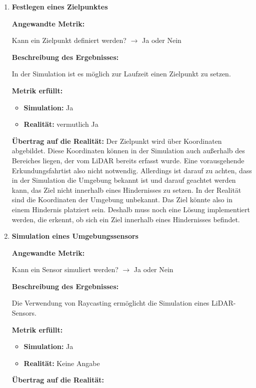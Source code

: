 \begin{enumerate}[leftmargin=*]
    \item \textbf{Festlegen eines Zielpunktes}

    \textbf{Angewandte Metrik:}

    Kann ein Zielpunkt definiert werden? $\to$ Ja oder Nein

    \textbf{Beschreibung des Ergebnisses:}

    In der Simulation ist es möglich zur Laufzeit einen Zielpunkt zu setzen. 

    \textbf{Metrik erfüllt:}
    \begin{itemize}
        \item \textbf{Simulation:} Ja
        \item \textbf{Realität:} vermutlich Ja
    \end{itemize}
    
    \textbf{Übertrag auf die Realität:}
    Der Zielpunkt wird über Koordinaten abgebildet. 
    Diese Koordinaten können in der Simulation auch außerhalb des Bereiches liegen, der vom LiDAR bereits erfasst wurde.
    Eine vorausgehende \glqq Erkundungsfahrt\grqq ist also nicht notwendig.
    Allerdings ist darauf zu achten, dass in der Simulation die Umgebung bekannt ist und darauf geachtet werden kann,
    das Ziel nicht innerhalb eines Hindernisses zu setzen.
    In der Realität sind die Koordinaten der Umgebung unbekannt. 
    Das Ziel könnte also in einem Hindernis platziert sein.
    Deshalb muss noch eine Lösung implementiert werden, die erkennt, ob sich ein Ziel innerhalb eines Hindernisses befindet.


    \item \textbf{Simulation eines Umgebungssensors}

    \textbf{Angewandte Metrik:}

    Kann ein Sensor simuliert werden? $\to$ Ja oder Nein

    \textbf{Beschreibung des Ergebnisses:}

    Die Verwendung von Raycasting ermöglicht die Simulation eines LiDAR-Sensors.      

    \textbf{Metrik erfüllt:}
    \begin{itemize}
        \item \textbf{Simulation:} Ja
        \item \textbf{Realität:} Keine Angabe
    \end{itemize}
    
    \textbf{Übertrag auf die Realität:}


\end{enumerate}
